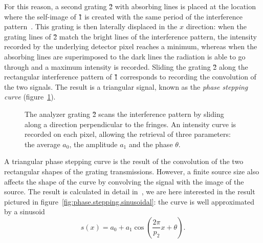 For this reason, a second grating \G2 with absorbing lines is placed at the
location where the self-image of \G1 is created with the same period of the
interference pattern~\parencite{Pfeiffer2006}. This grating is then laterally displaced in the $x$
direction: when the grating lines of \G2
match the bright lines of the interference pattern, the intensity recorded
by the underlying detector pixel reaches a minimum, whereas when the
absorbing lines are superimposed to the dark lines the radiation is able to
go through and a maximum intensity is recorded. Sliding the grating \G2
along the rectangular interference pattern of \G1 corresponds to recording
the convolution of the two signals. The result is a triangular signal, known
as the \emph{phase stepping curve} (figure~\ref{fig:phase.stepping}).
\begin{figure}[htb]
    \centering
    
    \caption[Phase stepping curve.]{The analyzer grating \G{2} scans the
    interference pattern by sliding along a direction perpendicular to the
    fringes. An intensity curve is recorded on each pixel, allowing the
    retrieval of three parameters: the average $a_0$, the amplitude $a_1$
and the phase $\theta$.}
    \label{fig:phase.stepping}
\end{figure}

A triangular phase stepping curve is the result of the convolution of the
two rectangular shapes of the grating transmissions. However, a finite
source size also affects the shape of the curve by convolving the signal
with the image of the source. The result is calculated in detail
in~\parencite{Bech2009}, we
are here interested in the result pictured in
figure~\ref{fig:phase.stepping.sinusoidal}: the curve is well approximated by a
sinusoid
\begin{equation*}
    s(x) = a_0 + a_1 \cos \left(\frac{2 \pi}{p_2} x + \theta\right).
\end{equation*}

